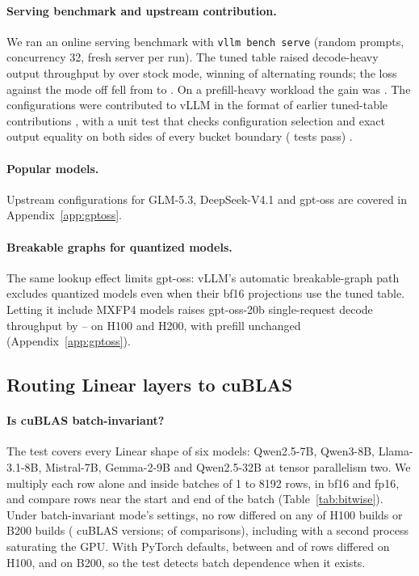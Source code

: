 \paragraph{Serving benchmark and upstream contribution.} We ran an online serving benchmark with \texttt{vllm bench serve} (random prompts, concurrency 32, fresh server per run). The tuned table raised decode-heavy output throughput by \ServeDecGain{} over stock mode, winning \ServeWins{} of \ServeRounds{} alternating rounds; the loss against the mode off fell from \ServeDecStockLoss{} to \ServeDecTunedLoss{}. On a prefill-heavy workload the gain was \ServePreGain{}. The configurations were contributed to vLLM in the format of earlier tuned-table contributions \citep{vllm62219,vllm65903}, with a unit test that checks configuration selection and exact output equality on both sides of every bucket boundary (\ServeUnit{} tests pass) \citep{vllm65931}.

\paragraph{Popular models.} Upstream configurations for GLM-5.3, DeepSeek-V4.1 and gpt-oss are covered in Appendix~\ref{app:gptoss}.

\paragraph{Breakable graphs for quantized models.} The same lookup effect limits gpt-oss: vLLM's automatic breakable-graph path excludes quantized models even when their bf16 projections use the tuned table. Letting it include MXFP4 models raises gpt-oss-20b single-request decode throughput by \OssGateDecOneMin{}--\OssGateDecOneMax{} on H100 and H200, with prefill unchanged (Appendix~\ref{app:gptoss}).



\subsection{Routing Linear layers to cuBLAS}\label{sec:cublas}
\paragraph{Is cuBLAS batch-invariant?} The test covers every Linear shape of six models: Qwen2.5-7B, Qwen3-8B, Llama-3.1-8B, Mistral-7B, Gemma-2-9B and Qwen2.5-32B at tensor parallelism two. We multiply each row alone and inside batches of 1 to 8192 rows, in bf16 and fp16, and compare rows near the start and end of the batch (Table~\ref{tab:bitwise}). Under batch-invariant mode's settings, no row differed on any of \PoneBuildsHundred{} H100 builds or \PoneBuildsBlackwell{} B200 builds (\PoneCublasVersions{} cuBLAS versions; \PoneBadTotal{} of \PoneComparisons{} comparisons), including with a second process saturating the GPU. With PyTorch defaults, between \PoneCtlMinH{} and \PoneCtlMaxH{} of \PoneRowsPerMode{} rows differed on H100, and \PoneCtlB{} on B200, so the test detects batch dependence when it exists.

